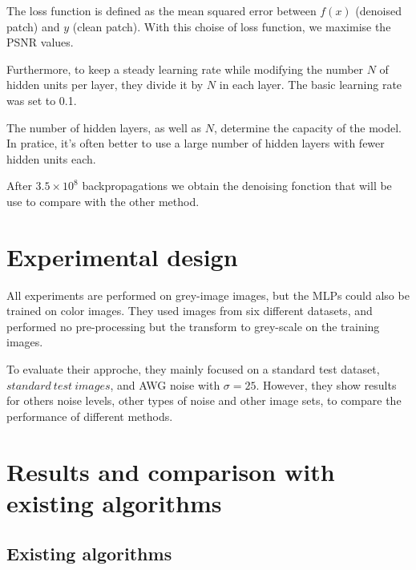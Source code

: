 \documentclass[10pt,a4paper]{article}
\newcommand{\svs}{\vspace{9pt}}
\begin{document}
\svs

The loss function is defined as the mean squared error between $f(x)$ (denoised patch) and $y$ (clean patch). With this choise of loss function, we maximise the PSNR values. %


\svs


\svs

Furthermore, to keep a steady learning rate while modifying the number $N$ of hidden units per layer, they divide it by $N$ in each layer. The basic learning rate was set to 0.1. 

\svs

The number of hidden layers, as well as $N$, determine the capacity of the model. In pratice, it's often better to use a large number of hidden layers with fewer hidden units each.

\svs
After $3.5 \times 10^8$ backpropagations we obtain the denoising fonction that will be use to compare with the other method.

\svs

\section{Experimental design}

All experiments are performed on grey-image images, but the MLPs could also be trained on color images. They used images from six different datasets, and performed no pre-processing but the transform to grey-scale on the training images. 

\svs 

To evaluate their approche, they mainly focused on a standard test dataset, $standard\ test\ images$, and AWG noise with $\sigma=25$. However, they show results for others noise levels, other types of noise and other image sets, to compare the performance of different methods.




\section{Results and comparison with existing algorithms}



\subsection{Existing algorithms}
\end{document}
